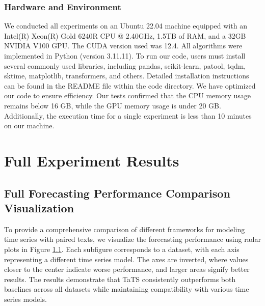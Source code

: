 \subsubsection{Hardware and Environment}
We conducted all experiments on an Ubuntu 22.04 machine equipped with an Intel(R) Xeon(R) Gold 6240R CPU @ 2.40GHz, 1.5TB of RAM, and a 32GB NVIDIA V100 GPU. The CUDA version used was 12.4. All algorithms were implemented in Python (version 3.11.11). To run our code, users must install several commonly used libraries, including pandas, scikit-learn, patool, tqdm, sktime, matplotlib, transformers, and others. Detailed installation instructions can be found in the README file within the code directory. We have optimized our code to ensure efficiency. Our tests confirmed that the CPU memory usage remains below 16 GB, while the GPU memory usage is under 20 GB. Additionally, the execution time for a single experiment is less than 10 minutes on our machine.










\section{Full Experiment Results}
\label{ap: full results}


\subsection{Full Forecasting Performance Comparison Visualization}
\label{ap: full radar}
To provide a comprehensive comparison of different frameworks for modeling time series with paired texts, we visualize the forecasting performance using radar plots in Figure \ref{ap: full radar}. Each subfigure corresponds to a dataset, with each axis representing a different time series model. The axes are inverted, where values closer to the center indicate worse performance, and larger areas signify better results. The results demonstrate that TaTS consistently outperforms both baselines across all datasets while maintaining compatibility with various time series models.


